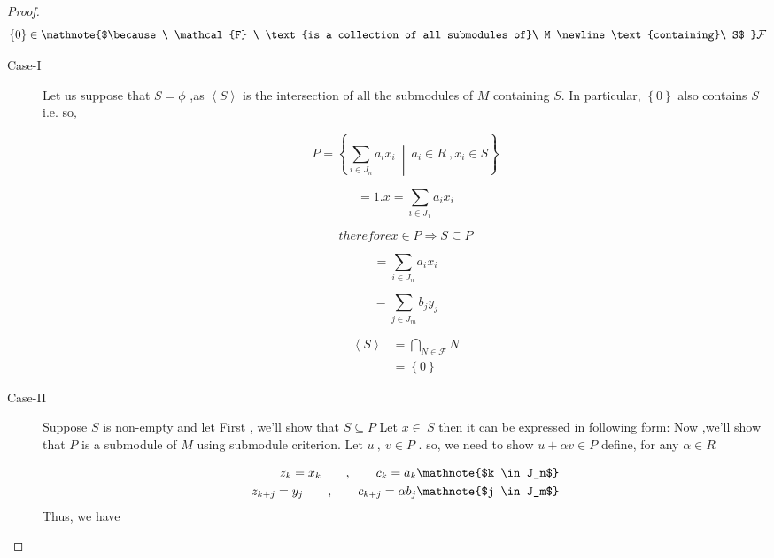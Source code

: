 \begin{proof}

\[
\left\lbrace 0\right\rbrace  \in\mathnote{$\because \ \mathcal{F} \ \text{is a collection of all submodules of}\ M \newline \text{containing}\ S$ } \mathcal{F}  
\]

\begin{description}
	\item[Case-I] Let us suppose that $S = \phi $ ,as $ \left\langle S\right\rangle $ is the intersection of all the submodules of $ M $ containing $S$. \newline \bigskip In particular, $ \left\lbrace 0\right\rbrace  $ also contains $S$ i.e. 
	so,

\[
P = \left\lbrace \sum\limits_{i \in J_n} a_i x_i \ \middle\vert \  a_i \in R \ , x_i \in S\right\rbrace
\]

\[
 = 1.x = \sum\limits_{i \in J_1} a_i x_i 
\]

\[
therefore x \in  P \Rightarrow S \subseteq P 
\]

\[
 = \sum\limits_{i\in J_n} a_i x_i
\]

\[
 = \sum\limits_{j\in J_m} b_j y_j
\]

\begin{align*}
 \left\langle S\right\rangle &= \bigcap_{N \in \mathcal{F}}N  \\& = \left\lbrace 0\right\rbrace   
\end{align*}
    \item[Case-II] Suppose $S$ is non-empty and let    
         First , we'll show that $S\subseteq P$ \newline
         Let $x \in\ S$ then it can be expressed in following form:
         Now ,we'll show that $P$ is a submodule of $M$ using submodule criterion.           \newline
         Let $u\ ,\ v \in P$ . so, we need to show $u + \alpha v \in P$ 
          define, for any $\alpha \in R$

\begin{align*}
 z_k = x_k \qquad ,\qquad c_k = a_k     \mathnote{$k \in J_n$}  \\
           z_{k+j} = y_j \qquad , \qquad c_{k+j} = \alpha b_j    \mathnote{$j \in J_m$}  
\end{align*}
          Thus, we have


\end{description}
\end{proof}
